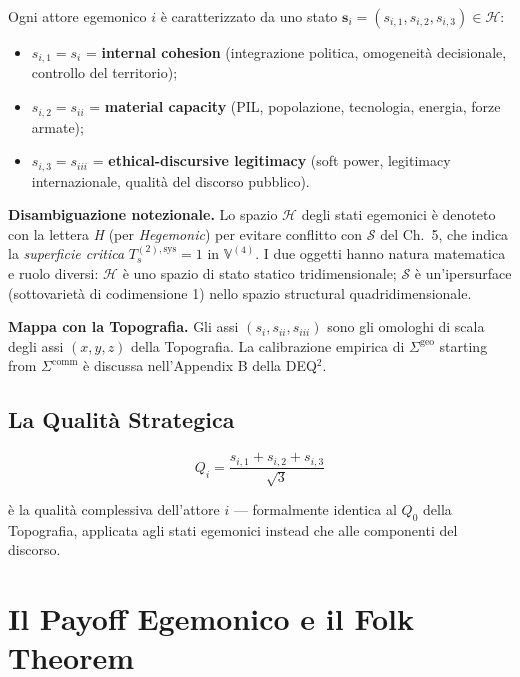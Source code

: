 Ogni attore egemonico \(i\) è caratterizzato da uno stato
\(\mathbf{s}_i = (s_{i,1}, s_{i,2}, s_{i,3}) \in \mathcal{H}\):

\begin{itemize}
\tightlist
\item
  \(s_{i,1} = s_i\) = \textbf{internal cohesion} (integrazione politica,
  omogeneità decisionale, controllo del territorio);
\item
  \(s_{i,2} = s_{ii}\) = \textbf{material capacity} (PIL, popolazione,
  tecnologia, energia, forze armate);
\item
  \(s_{i,3} = s_{iii}\) = \textbf{ethical-discursive legitimacy} (soft
  power, legitimacy internazionale, qualità del discorso pubblico).
\end{itemize}

\Hypoth{} \textbf{Disambiguazione notezionale.} Lo spazio
\(\mathcal{H}\) degli stati egemonici è denoteto con la lettera \emph{H}
(per \emph{Hegemonic}) per evitare conflitto con \(\mathcal{S}\) del
Ch.~5, che indica la \emph{superficie critica}
\(T_s^{(2),\text{sys}} = 1\) in \(\mathbb{V}^{(4)}\). I due oggetti
hanno natura matematica e ruolo diversi: \(\mathcal{H}\) è uno spazio di
stato statico tridimensionale; \(\mathcal{S}\) è un'ipersurface
(sottovarietà di codimensione 1) nello spazio structural
quadridimensionale.

\Hypoth{} \textbf{Mappa con la Topografia.} Gli assi
\((s_i, s_{ii}, s_{iii})\) sono gli omologhi di scala degli assi
\((x, y, z)\) della Topografia. La calibrazione empirica di
\(\Sigma^{\text{geo}}\) starting from \(\Sigma^{\text{comm}}\) è discussa
nell'Appendix B della DEQ$^2$.

\subsection{La Qualità Strategica}\label{la-qualituxe0-strategica}

\[
Q_i = \frac{s_{i,1} + s_{i,2} + s_{i,3}}{\sqrt{3}}
\]

è la qualità complessiva dell'attore \(i\) --- formalmente identica al
\(Q_0\) della Topografia, applicata agli stati egemonici instead che alle
componenti del discorso.



\section{Il Payoff Egemonico e il Folk
Theorem}\label{il-payoff-egemonico-e-il-folk-theorem}

